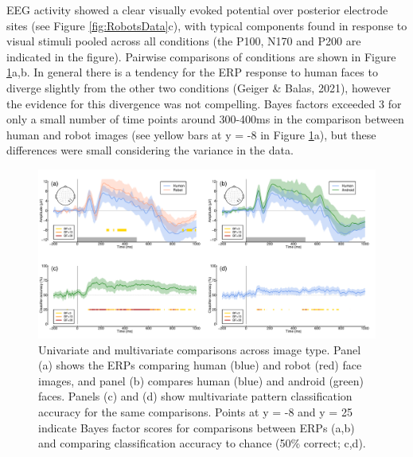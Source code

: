 \documentclass[
]{article}
\begin{document}
EEG activity showed a clear visually evoked potential over posterior electrode sites (see Figure \ref{fig:RobotsData}c), with typical components found in response to visual stimuli pooled across all conditions (the P100, N170 and P200 are indicated in the figure). Pairwise comparisons of conditions are shown in Figure \ref{fig:RobotsMVPA}a,b. In general there is a tendency for the ERP response to human faces to diverge slightly from the other two conditions (Geiger \& Balas, 2021), however the evidence for this divergence was not compelling. Bayes factors exceeded 3 for only a small number of time points around 300-400ms in the comparison between human and robot images (see yellow bars at y = -8 in Figure \ref{fig:RobotsMVPA}a), but these differences were small considering the variance in the data.

\begin{figure}

{\centering \includegraphics{Figures/RobotsMVPA} 

}

\caption{Univariate and multivariate comparisons across image type. Panel (a) shows the ERPs comparing human (blue) and robot (red) face images, and panel (b) compares human (blue) and android (green) faces. Panels (c) and (d) show multivariate pattern classification accuracy for the same comparisons. Points at y = -8 and y = 25 indicate Bayes factor scores for comparisons between ERPs (a,b) and comparing classification accuracy to chance (50\% correct; c,d).}\label{fig:RobotsMVPA}
\end{figure}
\end{document}
